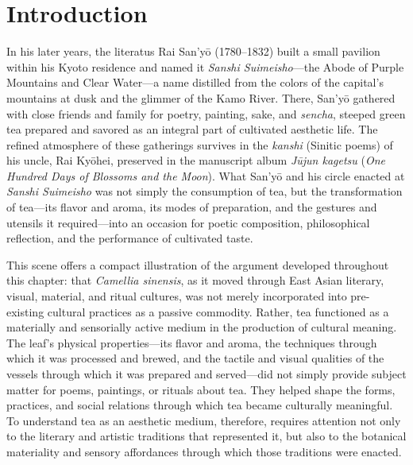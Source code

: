 \documentclass[numbers]{IntechOpen-Book}
\begin{document}
\section{Introduction}

In his later years, the literatus Rai San'yō (1780--1832) built a small pavilion within his Kyoto residence and named it \textit{Sanshi Suimeisho}---the Abode of Purple Mountains and Clear Water---a name distilled from the colors of the capital's mountains at dusk and the glimmer of the Kamo River. There, San'yō gathered with close friends and family for poetry, painting, sake, and \textit{sencha}, steeped green tea prepared and savored as an integral part of cultivated aesthetic life. The refined atmosphere of these gatherings survives in the \textit{kanshi} (Sinitic poems) of his uncle, Rai Kyōhei, preserved in the manuscript album \textit{Jūjun kagetsu} (\textit{One Hundred Days of Blossoms and the Moon}). What San'yō and his circle enacted at \textit{Sanshi Suimeisho} was not simply the consumption of tea, but the transformation of tea---its flavor and aroma, its modes of preparation, and the gestures and utensils it required---into an occasion for poetic composition, philosophical reflection, and the performance of cultivated taste.

This scene offers a compact illustration of the argument developed throughout this chapter: that \textit{Camellia sinensis}, as it moved through East Asian literary, visual, material, and ritual cultures, was not merely incorporated into pre-existing cultural practices as a passive commodity. Rather, tea functioned as a materially and sensorially active medium in the production of cultural meaning. The leaf's physical properties---its flavor and aroma, the techniques through which it was processed and brewed, and the tactile and visual qualities of the vessels through which it was prepared and served---did not simply provide subject matter for poems, paintings, or rituals about tea. They helped shape the forms, practices, and social relations through which tea became culturally meaningful. To understand tea as an aesthetic medium, therefore, requires attention not only to the literary and artistic traditions that represented it, but also to the botanical materiality and sensory affordances through which those traditions were enacted.
\end{document}
